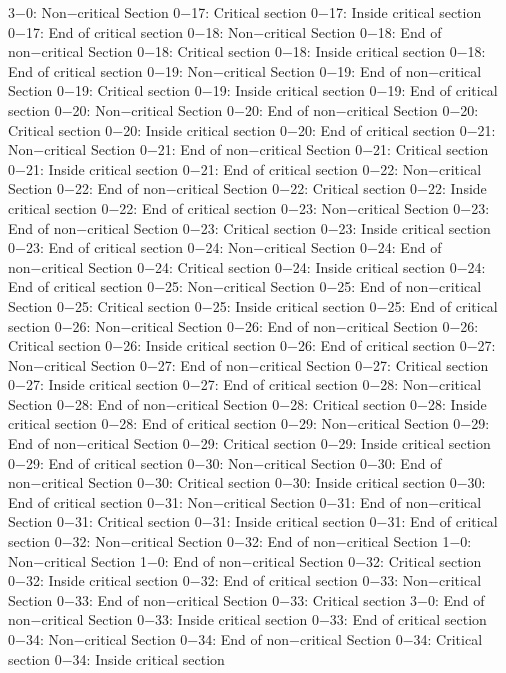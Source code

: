 3−0: Non−critical Section
0−17: Critical section
0−17: Inside critical section
0−17: End of critical section
0−18: Non−critical Section
0−18: End of non−critical Section
0−18: Critical section
0−18: Inside critical section
0−18: End of critical section
0−19: Non−critical Section
0−19: End of non−critical Section
0−19: Critical section
0−19: Inside critical section
0−19: End of critical section
0−20: Non−critical Section
0−20: End of non−critical Section
0−20: Critical section
0−20: Inside critical section
0−20: End of critical section
0−21: Non−critical Section
0−21: End of non−critical Section
0−21: Critical section
0−21: Inside critical section
0−21: End of critical section
0−22: Non−critical Section
0−22: End of non−critical Section
0−22: Critical section
0−22: Inside critical section
0−22: End of critical section
0−23: Non−critical Section
0−23: End of non−critical Section
0−23: Critical section
0−23: Inside critical section
0−23: End of critical section
0−24: Non−critical Section
0−24: End of non−critical Section
0−24: Critical section
0−24: Inside critical section
0−24: End of critical section
0−25: Non−critical Section
0−25: End of non−critical Section
0−25: Critical section
0−25: Inside critical section
0−25: End of critical section
0−26: Non−critical Section
0−26: End of non−critical Section
0−26: Critical section
0−26: Inside critical section
0−26: End of critical section
0−27: Non−critical Section
0−27: End of non−critical Section
0−27: Critical section
0−27: Inside critical section
0−27: End of critical section
0−28: Non−critical Section
0−28: End of non−critical Section
0−28: Critical section
0−28: Inside critical section
0−28: End of critical section
0−29: Non−critical Section
0−29: End of non−critical Section
0−29: Critical section
0−29: Inside critical section
0−29: End of critical section
0−30: Non−critical Section
0−30: End of non−critical Section
0−30: Critical section
0−30: Inside critical section
0−30: End of critical section
0−31: Non−critical Section
0−31: End of non−critical Section
0−31: Critical section
0−31: Inside critical section
0−31: End of critical section
0−32: Non−critical Section
0−32: End of non−critical Section
1−0: Non−critical Section
1−0: End of non−critical Section
0−32: Critical section
0−32: Inside critical section
0−32: End of critical section
0−33: Non−critical Section
0−33: End of non−critical Section
0−33: Critical section
3−0: End of non−critical Section
0−33: Inside critical section
0−33: End of critical section
0−34: Non−critical Section
0−34: End of non−critical Section
0−34: Critical section
0−34: Inside critical section

